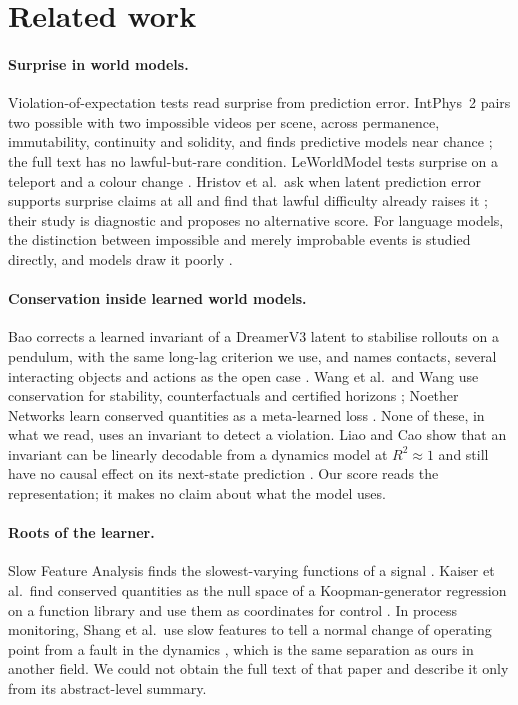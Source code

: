 \documentclass[11pt]{article}
\begin{document}
\section{Related work}\label{sec:related}

\paragraph{Surprise in world models.} Violation-of-expectation tests read surprise from prediction
error. IntPhys~2 pairs two possible with two impossible videos per scene, across permanence,
immutability, continuity and solidity, and finds predictive models near chance
\citep{bordes2025intphys2}; the full text has no lawful-but-rare condition. LeWorldModel tests
surprise on a teleport and a colour change \citep{maes2026lewm}. Hristov et al.\ ask when latent
prediction error supports surprise claims at all and find that lawful difficulty already raises it
\citep{hristov2026surprise}; their study is diagnostic and proposes no alternative score. For
language models, the distinction between impossible and merely improbable events is studied
directly, and models draw it poorly \citep{kauf2023event,michaelov2025sherlock}.

\paragraph{Conservation inside learned world models.} Bao corrects a learned invariant of a
DreamerV3 latent to stabilise rollouts on a pendulum, with the same long-lag criterion we use, and
names contacts, several interacting objects and actions as the open case
\citep{bao2026invariant}. Wang et al.\ and Wang use conservation for stability, counterfactuals and
certified horizons \citep{wang2026conservation,wang2026certified}; Noether Networks learn
conserved quantities as a meta-learned loss \citep{alet2021noether}. None of these, in what we
read, uses an invariant to detect a violation. Liao and Cao show that an invariant can be linearly
decodable from a dynamics model at $R^2 \approx 1$ and still have no causal effect on its next-state
prediction \citep{liao2026objective}. Our score reads the representation; it makes no claim about
what the model uses.

\paragraph{Roots of the learner.} Slow Feature Analysis finds the slowest-varying functions of a
signal \citep{wiskott2002sfa}. Kaiser et al.\ find conserved quantities as the null space of a
Koopman-generator regression on a function library and use them as coordinates for control
\citep{kaiser2018conservation}. In process monitoring, Shang et al.\ use slow features to tell a
normal change of operating point from a fault in the dynamics \citep{shang2015concurrent}, which is
the same separation as ours in another field. We could not obtain the full text of that paper and
describe it only from its abstract-level summary.
\end{document}
